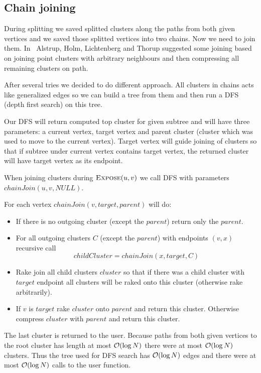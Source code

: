 \subsection{Chain joining}

During splitting we saved splitted clusters along the paths from both given
vertices and we saved those splitted vertices into two chains. Now we need to
join them. In~\cite{TopTrees} Alstrup, Holm, Lichtenberg and Thorup suggested
some joining based on joining point clusters with arbitrary neighbours and then
compressing all remaining clusters on path.

After several tries we decided to do different approach. All clusters in chains
acts like generalized edges so we can build a tree from them and then run
a DFS (depth first search) on this tree.

Our DFS will return computed top cluster for given subtree and will have three
parameters: a current vertex, target vertex and parent cluster (cluster which
was used to move to the current vertex). Target vertex will guide joining of
clusters so that if subtree under current vertex contains target vertex, the
returned cluster will have target vertex as its endpoint.

When joining clusters during $\hbox{\sc Expose}(u,v)$ we call DFS with parameters
$chainJoin(u,v,NULL)$.

For each vertex $chainJoin(v,target,parent)$ will do:
\begin{itemize}
\item If there is no outgoing cluster (except the $parent$) return only the
$parent$.
\item For all outgoing clusters $C$ (except the $parent$) with endpoints $(v,x)$
recursive call $$childCluster = chainJoin(x,target,C)$$
\item Rake join all child clusters $cluster$ so that if there was a child
cluster with $target$ endpoint all clusters will be raked onto this cluster
(otherwise rake arbitrarily).
\item If $v$ is $target$ rake $cluster$ onto $parent$ and return this cluster.
Otherwise compress $cluster$ with $parent$ and return this cluster.
\end{itemize}


The last cluster is returned to the user. Because paths from both given vertices
to the root cluster has length at most ${\cal O}(\log N)$ there were at most ${\cal O}(\log
N)$ clusters. Thus the tree used for DFS search has ${\cal O}(\log N)$ edges and there
were at most ${\cal O}(\log N)$ calls to the \Join{} user function.

